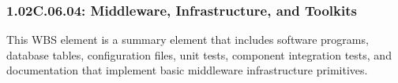\subsubsection*{1.02C.06.04: Middleware, Infrastructure, and Toolkits}

This WBS element is a summary element that includes software programs, database tables, configuration files, unit tests, component integration tests, and documentation that implement basic middleware infrastructure primitives.
